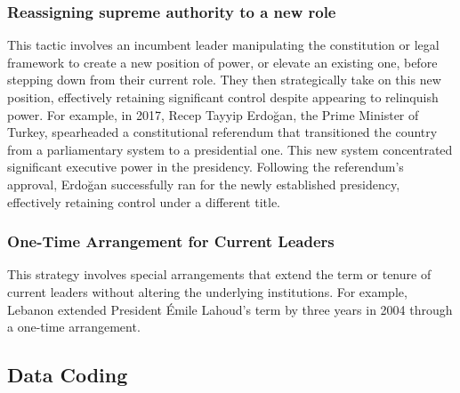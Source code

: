 \documentclass[
  12pt,
]{report}
\begin{document}
\subsubsection*{Reassigning supreme authority to a new
role}\label{reassigning-supreme-authority-to-a-new-role}

This tactic involves an incumbent leader manipulating the constitution
or legal framework to create a new position of power, or elevate an
existing one, before stepping down from their current role. They then
strategically take on this new position, effectively retaining
significant control despite appearing to relinquish power. For example,
in 2017, Recep Tayyip Erdoğan, the Prime Minister of Turkey, spearheaded
a constitutional referendum that transitioned the country from a
parliamentary system to a presidential one. This new system concentrated
significant executive power in the presidency. Following the
referendum's approval, Erdoğan successfully ran for the newly
established presidency, effectively retaining control under a different
title.

\subsubsection*{One-Time Arrangement for Current
Leaders}\label{one-time-arrangement-for-current-leaders}

This strategy involves special arrangements that extend the term or
tenure of current leaders without altering the underlying institutions.
For example, Lebanon extended President Émile Lahoud's term by three
years in 2004 through a one-time arrangement.

\subsection{Data Coding}\label{data-coding}

\begingroup
\setlength{}
\setlength{}\fontsize{12.0pt}{14.4pt}\selectfont
\end{document}
